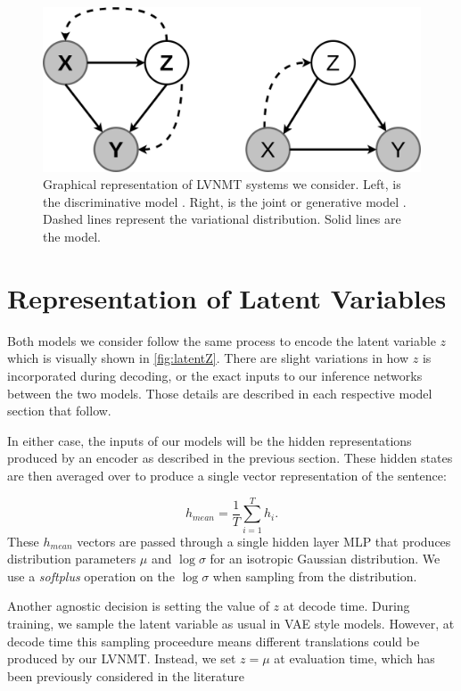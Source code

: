 \begin{figure}
	\includegraphics[width=\linewidth]{PGMofModels.png}
	\caption{Graphical representation of \ac{LVNMT} systems we consider. Left, is the discriminative model \cite{Zhang2016VNMT}. Right, is the joint or generative model \cite{eikema2018AEVNMT}. Dashed lines represent the variational distribution. Solid lines are the model.}
	\label{fig:graphicalmodel}
\end{figure}


\section{Representation of Latent Variables}

Both models we consider follow the same process to encode the latent variable $z$ which is visually shown in \ref{fig:latentZ}. There are slight variations in how $z$ is incorporated during decoding, or the exact inputs to our inference networks between the two models. Those details are described in each respective model section that follow. 

In either case, the inputs of our models will be the hidden representations produced by an encoder as described in the previous section. These hidden states are then averaged over to produce a single vector representation of the sentence:

\begin{equation}
h_{mean} = \frac{1}{T} \sum_{i=1}^{T} h_{i}.
\end{equation}
These $h_{mean}$ vectors are passed through a single hidden layer \ac{MLP} that produces distribution parameters $\mu$ and $\log \sigma$ for an isotropic Gaussian distribution. We use a \textit{softplus} operation on the $\log\sigma$ when sampling from the distribution. 

Another agnostic decision is setting the value of $z$ at decode time. During training, we sample the latent variable as usual in VAE style models. However, at decode time this sampling proceedure means different translations could be produced by our \ac{LVNMT}. Instead, we set $z=\mu$ at evaluation time, which has been previously considered in the literature \cite{Zhang2016VNMT, eikema2018AEVNMT}


